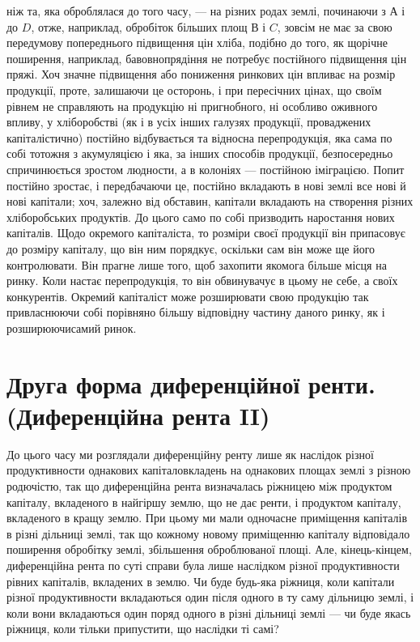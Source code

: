 \parcont{}  %
ніж та, яка оброблялася до того часу, — на різних родах землі, починаючи з $А$
і до $D$, отже, наприклад, обробіток більших площ $В$ і $C$, зовсім не має за свою передумову
попереднього підвищення цін хліба, подібно до того, як щорічне поширення,
наприклад, бавовнопрядіння не потребує постійного підвищення цін пряжі. Хоч
значне підвищення або пониження ринкових цін впливає на розмір продукції,
проте, залишаючи це осторонь, і при пересічних цінах, що своїм рівнем не справляють
на продукцію ні пригнобного, ні особливо оживного впливу, у хліборобстві
(як і в усіх інших галузях продукції, проваджених капіталістично) постійно
відбувається та відносна перепродукція, яка сама по собі тотожня з
акумуляцією і яка, за інших способів продукції, безпосередньо спричинюється
зростом людности, а в колоніях — постійною іміграцією. Попит постійно зростає,
і передбачаючи це, постійно вкладають в нові землі все нові й нові капітали;
хоч, залежно від обставин, капітали вкладають на створення різних хліборобських
продуктів. До цього само по собі призводить наростання нових капіталів.
Щодо окремого капіталіста, то розміри своєї продукції він припасовує до розміру
капіталу, що він ним порядкує, оскільки сам він може ще його контролювати.
Він прагне лише того, щоб захопити якомога більше місця на ринку.
Коли настає перепродукція, то він обвинувачує в цьому не себе, а своїх конкурентів.
Окремий капіталіст може розширювати свою продукцію так привласнюючи
собі порівняно більшу відповідну частину даного ринку, як і розширюючисамий
ринок.

\section{Друга форма диференційної ренти.
(Диференційна рента II)}

До цього часу ми розглядали диференційну ренту лише як наслідок різної
продуктивности однакових капіталовкладень на однакових площах землі з різною
родючістю, так що диференційна рента визначалась ріжницею між продуктом
капіталу, вкладеного в найгіршу землю, що не дає ренти, і продуктом капіталу,
вкладеного в кращу землю. При цьому ми мали одночасне приміщення капіталів
в різні дільниці землі, так що кожному новому приміщенню капіталу відповідало
поширення обробітку землі, збільшення оброблюваної площі. Але, кінець-кінцем,
диференційна рента по суті справи була лише наслідком різної
продуктивности рівних капіталів, вкладених в землю. Чи буде будь-яка ріжниця,
коли капітали різної продуктивности вкладаються один після одного в ту
саму дільницю землі, і коли вони вкладаються один поряд одного в різні дільниці
землі — чи буде якась ріжниця, коли тільки припустити, що наслідки ті самі?

